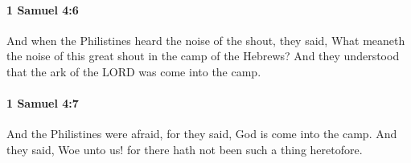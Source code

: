 		\paragraph{1 Samuel 4:6} %
			\label{1SAMUEL-4-6}

			And when the Philistines heard the noise of the shout, they said, What meaneth the noise of this great shout in the camp of the Hebrews? And they understood that the ark of the LORD was come into the camp.


		\paragraph{1 Samuel 4:7} %
			\label{1SAMUEL-4-7}

			And the Philistines were afraid, for they said, God is come into the camp. And they said, Woe unto us! for there hath not been such a thing heretofore.


